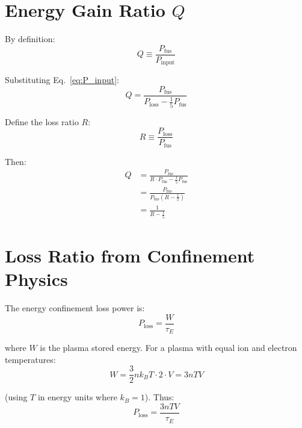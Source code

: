 \documentclass[11pt,a4paper]{article}
\begin{document}
\section{Energy Gain Ratio $Q$}

By definition:
\begin{equation}
Q \equiv \frac{P_{\text{fus}}}{P_{\text{input}}}
\label{eq:Q_def}
\end{equation}

Substituting Eq.~\eqref{eq:P_input}:
\begin{equation}
Q = \frac{P_{\text{fus}}}{P_{\text{loss}} - \frac{1}{5} P_{\text{fus}}}
\end{equation}

Define the loss ratio $R$:
\begin{equation}
R \equiv \frac{P_{\text{loss}}}{P_{\text{fus}}}
\label{eq:R_def}
\end{equation}

Then:
\begin{align}
Q &= \frac{P_{\text{fus}}}{R \cdot P_{\text{fus}} - \frac{1}{5} P_{\text{fus}}} \nonumber \\
  &= \frac{P_{\text{fus}}}{P_{\text{fus}} \left(R - \frac{1}{5}\right)} \nonumber \\
  &= \frac{1}{R - \frac{1}{5}}
\label{eq:Q_of_R}
\end{align}

\section{Loss Ratio from Confinement Physics}

The energy confinement loss power is:
\begin{equation}
P_{\text{loss}} = \frac{W}{\tau_E}
\end{equation}

where $W$ is the plasma stored energy. For a plasma with equal ion and electron temperatures:
\begin{equation}
W = \frac{3}{2} n k_B T \cdot 2 \cdot V = 3nTV
\end{equation}

(using $T$ in energy units where $k_B = 1$). Thus:
\begin{equation}
P_{\text{loss}} = \frac{3nTV}{\tau_E}
\label{eq:P_loss}
\end{equation}
\end{document}

